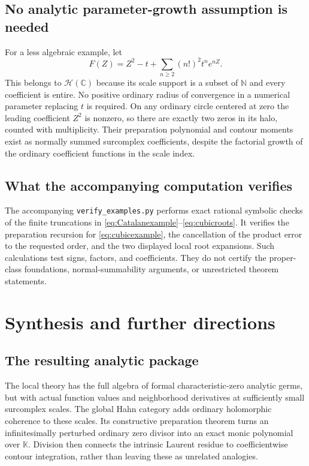 \documentclass[11pt,letterpaper]{article}
\numberwithin{equation}{section}
\theoremstyle{definition}
\theoremstyle{remark}
\newcommand{\K}{\mathbb K}
\newcommand{\C}{\mathbb C}
\newcommand{\N}{\mathbb N}
\newcommand{\HH}{\mathscr H}
\begin{document}
\subsection{No analytic parameter-growth assumption is needed}

For a less algebraic example, let
\[
 F(Z)=Z^2-t+\sum_{n\ge2}(n!)^2t^n e^{nZ}.
\]
This belongs to $\HH(\C)$ because its scale support is a subset of
$\N$ and every coefficient is entire. No positive ordinary radius of
convergence in a numerical parameter replacing $t$ is required.
On any ordinary circle centered at zero the leading coefficient $Z^2$
is nonzero, so there are exactly two zeros in its halo, counted with
multiplicity. Their preparation polynomial and contour moments exist
as normally summed surcomplex coefficients, despite the factorial
growth of the ordinary coefficient functions in the scale index.

\subsection{What the accompanying computation verifies}

The accompanying \texttt{verify\_examples.py} performs exact rational
symbolic checks of the finite truncations in
\eqref{eq:Catalanexample}--\eqref{eq:cubicroots}. It verifies the
preparation recursion for \eqref{eq:cubicexample}, the cancellation of
the product error to the requested order, and the two displayed local
root expansions. Such calculations test signs, factors, and
coefficients. They do not certify the proper-class foundations,
normal-summability arguments, or unrestricted theorem statements.

\section{Synthesis and further directions}
\label{sec:directions}

\subsection{The resulting analytic package}

The local theory has the full algebra of formal characteristic-zero
analytic germs, but with actual function values and neighborhood
derivatives at sufficiently small surcomplex scales. The global Hahn
category adds ordinary holomorphic coherence to these scales. Its
constructive preparation theorem turns an infinitesimally perturbed
ordinary zero divisor into an exact monic polynomial over $\K$.
Division then connects the intrinsic Laurent residue to coefficientwise
contour integration, rather than leaving these as unrelated analogies.
\end{document}
